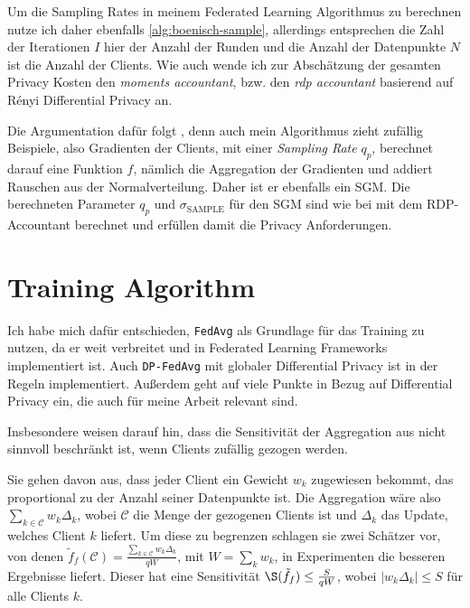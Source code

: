 Um die Sampling Rates in meinem Federated Learning Algorithmus zu berechnen nutze ich daher ebenfalls \autoref{alg:boenisch-sample}, allerdings entsprechen die Zahl der Iterationen $I$ hier der Anzahl der Runden und die Anzahl der Datenpunkte $N$ ist die Anzahl der Clients. Wie auch \textcite{mcmahan:2018, boenisch:2023} wende ich zur Abschätzung der gesamten Privacy Kosten den \textit{moments accountant}, bzw. den \textit{rdp accountant} \cite{wang:2020} basierend auf Rényi Differential Privacy \cite{mironov:2017} an.

Die Argumentation dafür folgt \textcite{boenisch:2023}, denn auch mein Algorithmus zieht zufällig Beispiele, also Gradienten der Clients, mit einer \textit{Sampling Rate} $q_p$, berechnet darauf eine Funktion $f$, nämlich die Aggregation der Gradienten und addiert Rauschen aus der Normalverteilung. Daher ist er ebenfalls ein SGM. Die berechneten Parameter $q_p$ und $\sigma_{\text{SAMPLE}}$ für den SGM sind wie bei \citeauthor{boenisch:2023} mit dem RDP-Accountant berechnet und erfüllen damit die Privacy Anforderungen.

\section{Training Algorithm}
Ich habe mich dafür entschieden, \texttt{FedAvg} als Grundlage für das Training zu nutzen, da er weit verbreitet und in Federated Learning Frameworks implementiert ist. Auch \texttt{DP-FedAvg} mit globaler Differential Privacy \cite{mcmahan:2018} ist in der Regeln implementiert. Außerdem geht \textcite{mcmahan:2018} auf viele Punkte in Bezug auf Differential Privacy ein, die auch für meine Arbeit relevant sind. 

Insbesondere weisen \citeauthor{mcmahan:2018} darauf hin, dass die Sensitivität der Aggregation aus nicht sinnvoll beschränkt ist, wenn Clients zufällig gezogen werden. 

Sie gehen davon aus, dass jeder Client ein Gewicht $w_k$ zugewiesen bekommt, das proportional zu der Anzahl seiner Datenpunkte ist. Die Aggregation wäre also $\sum_{k \in \mathcal{C}} w_k \Delta_k$, wobei $\mathcal{C}$ die Menge der gezogenen Clients ist und $\Delta_k$ das Update, welches Client $k$ liefert. Um diese zu begrenzen schlagen sie zwei Schätzer vor, von denen $\tilde{f}_f(\mathcal{C}) = \frac{\sum_{k \in \mathcal{C}} w_k \Delta_k}{qW}$, mit $W = \sum_k{w_k}$, in Experimenten die besseren Ergebnisse liefert. Dieser hat eine Sensitivität $\S(\tilde{f}_f) \leq \frac{S}{qW}$, wobei $|w_k \Delta_k| \leq S$ für alle Clients $k$.

